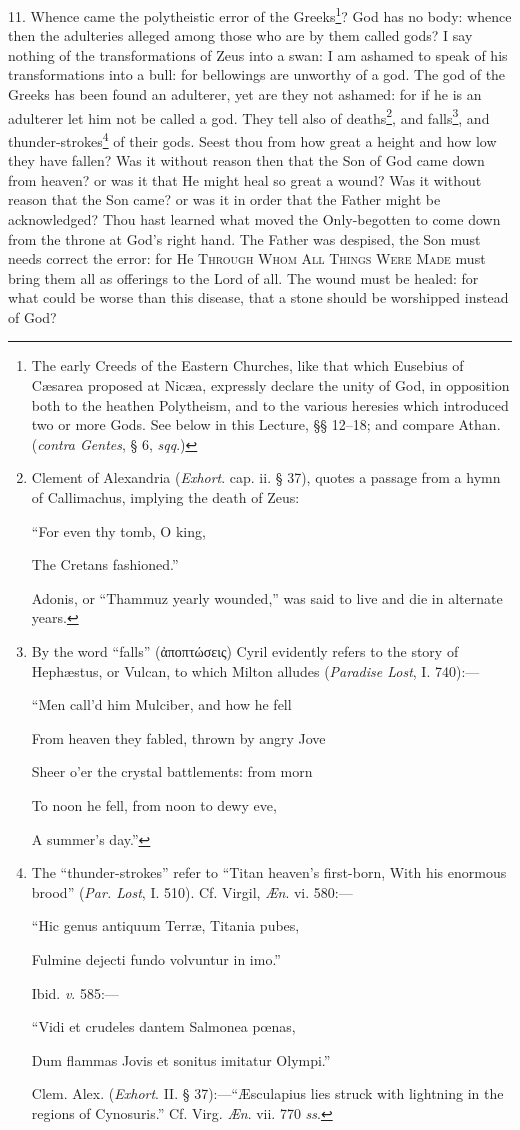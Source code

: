 11. Whence came the polytheistic error of the Greeks\footnote{The early Creeds of the Eastern Churches, like that which Eusebius of Cæsarea proposed at Nicæa, expressly declare the unity of God, in opposition both to the heathen Polytheism, and to the various heresies which introduced two or more Gods. See below in this Lecture, §§ 12–18; and compare Athan. (\emph{contra Gentes}, § 6, \emph{sqq}.)}? God has no body: whence then the adulteries alleged among those who are by them called gods? I say nothing of the transformations of Zeus into a swan: I am ashamed to speak of his transformations into a bull: for bellowings are unworthy of a god. The god of the Greeks has been found an adulterer, yet are they not ashamed: for if he is an adulterer let him not be called a god. They tell also of deaths\footnote{Clement of Alexandria (\emph{Exhort}. cap. ii. § 37), quotes a passage from a hymn of Callimachus, implying the death of Zeus: \par “For even thy tomb, O king, \par The Cretans fashioned.” \par Adonis, or “Thammuz yearly wounded,” was said to live and die in alternate years.}, and falls\footnote{By the word “falls” (\textgreek{ἀποπτώσεις}) Cyril evidently refers to the story of Hephæstus, or Vulcan, to which Milton alludes (\emph{Paradise Lost}, I. 740):— \par “Men call’d him Mulciber, and how he fell \par From heaven they fabled, thrown by angry Jove \par Sheer o’er the crystal battlements: from morn \par To noon he fell, from noon to dewy eve, \par A summer’s day.”}, and thunder-strokes\footnote{The “thunder-strokes” refer to “Titan heaven’s first-born, With his enormous brood” (\emph{Par. Lost}, I. 510). Cf. Virgil, \emph{Æn}. vi. 580:— \par “Hic genus antiquum Terræ, Titania pubes, \par Fulmine dejecti fundo volvuntur in imo.” \par Ibid. \emph{v}. 585:— \par “Vidi et crudeles dantem Salmonea pœnas, \par Dum flammas Jovis et sonitus imitatur Olympi.” \par Clem. Alex. (\emph{Exhort}. II. § 37):—“Æsculapius lies struck with lightning in the regions of Cynosuris.” Cf. Virg. \emph{Æn}. vii. 770 \emph{ss}.} of their gods. Seest thou from how great a height and how low they have fallen? Was it without reason then that the Son of God came down from heaven? or was it that He might heal so great a wound? Was it without reason that the Son came? or was it in order that the Father might be acknowledged? Thou hast learned what moved the Only-begotten to come down from the throne at God’s right hand. The Father was despised, the Son must needs correct the error: for He \textsc{Through} \textsc{Whom} \textsc{All} \textsc{Things} \textsc{Were} \textsc{Made} must bring them all as offerings to the Lord of all. The wound must be healed: for what could be worse than this disease, that a stone should be worshipped instead of God?

